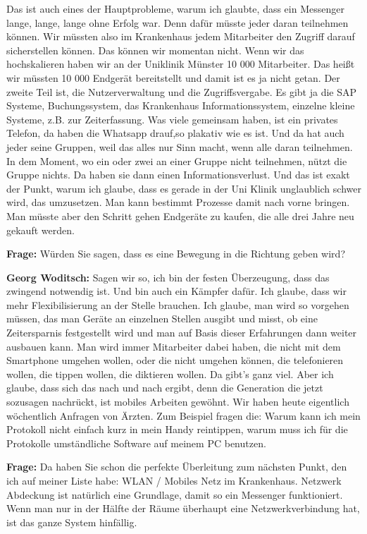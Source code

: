 Das ist auch eines der Hauptprobleme, warum ich glaubte, dass ein Messenger lange, lange, lange ohne Erfolg war. Denn dafür müsste jeder daran teilnehmen können. Wir müssten also im Krankenhaus jedem Mitarbeiter den Zugriff darauf sicherstellen können. Das können wir momentan nicht. Wenn wir das hochskalieren haben wir an der Uniklinik Münster 10 000 Mitarbeiter. Das heißt wir müssten 10 000 Endgerät bereitstellt und damit ist es ja nicht getan. Der zweite Teil ist, die Nutzerverwaltung und die Zugriffsvergabe. Es gibt ja die SAP Systeme, Buchungssystem, das Krankenhaus Informationssystem, einzelne kleine Systeme, z.B. zur Zeiterfassung. Was viele gemeinsam haben, ist ein privates Telefon, da haben die Whatsapp drauf,so plakativ wie es ist. Und da hat auch jeder seine Gruppen, weil das alles nur Sinn macht, wenn alle daran teilnehmen. In dem Moment, wo ein oder zwei an einer Gruppe nicht teilnehmen, nützt die Gruppe nichts. Da haben sie dann einen Informationsverlust. Und das ist exakt der Punkt, warum ich glaube, dass es gerade in der Uni Klinik unglaublich schwer wird, das umzusetzen. Man kann bestimmt Prozesse damit nach vorne bringen. Man müsste aber den Schritt gehen Endgeräte zu kaufen, die alle drei Jahre neu gekauft werden.

\textbf{Frage: } Würden Sie sagen, dass es eine Bewegung in die Richtung geben wird?

\textbf{Georg Woditsch: } Sagen wir so, ich bin der festen Überzeugung, dass das zwingend notwendig ist. Und bin auch ein Kämpfer dafür. Ich glaube, dass wir mehr Flexibilisierung an der Stelle brauchen. Ich glaube, man wird so vorgehen müssen, das man Geräte an einzelnen Stellen ausgibt und misst, ob eine Zeitersparnis festgestellt wird und man auf Basis dieser Erfahrungen dann weiter ausbauen kann. Man wird immer Mitarbeiter dabei haben, die nicht mit dem Smartphone umgehen wollen, oder die nicht umgehen können, die telefonieren wollen, die tippen wollen, die diktieren wollen. Da gibt's ganz viel. Aber ich glaube, dass sich das nach und nach ergibt, denn die Generation die jetzt sozusagen nachrückt, ist mobiles Arbeiten gewöhnt. Wir haben heute eigentlich wöchentlich Anfragen von Ärzten. Zum Beispiel fragen die: Warum kann ich mein Protokoll nicht einfach kurz in mein Handy reintippen, warum muss ich für die Protokolle umständliche Software auf meinem PC benutzen.

\textbf{Frage: }Da haben Sie schon die perfekte Überleitung zum nächsten Punkt, den ich auf meiner Liste habe:  WLAN / Mobiles Netz im Krankenhaus. Netzwerk Abdeckung ist natürlich eine Grundlage, damit so ein Messenger funktioniert. Wenn man nur in der Hälfte der Räume überhaupt eine Netzwerkverbindung hat, ist das ganze System hinfällig.

